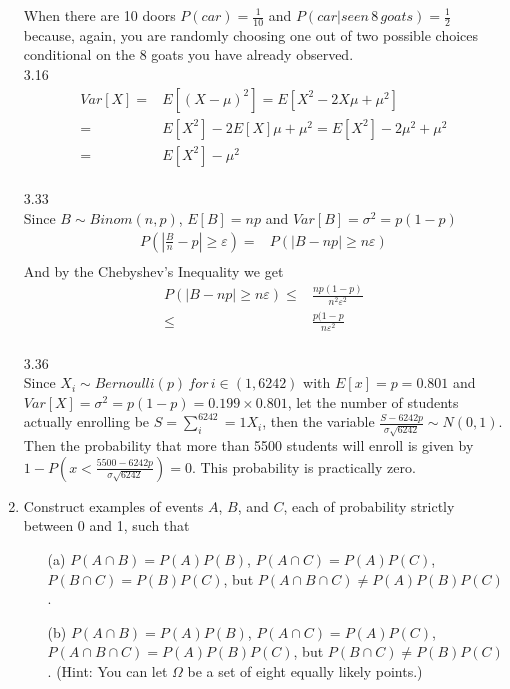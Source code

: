 \documentclass[letterpaper,12pt]{article}
\theoremstyle{definition}
\begin{document}
\begin{enumerate}
When there are 10 doors $P(car)=\frac{1}{10}$ and $P(car|seen\, 8\, goats) = \frac{1}{2}$ because, again, you are randomly choosing one out of two possible choices conditional on the 8 goats you have already observed.\\
3.16\\
\begin{align*}
Var[X] =& E\left[ (X-\mu)^2 \right] = E\left[ X^2 - 2 X \mu + \mu^2 \right] \\
=& E[X^2] - 2E[X]\mu +\mu^2 =  E[X^2] - 2\mu^2 +\mu^2 \\
=&  E[X^2] - \mu^2 
\end{align*}\\
3.33\\

Since $B \sim Binom(n, p)$, $E[B]=np$ and $Var[B]= \sigma^2 = p(1-p)$
\begin{align*}
P\left(|\frac{B}{n}-p| \geq \varepsilon \right) =& P \left( |B-np|  \geq n \varepsilon \right) \\
\end{align*}
And by the Chebyshev's Inequality we get
\begin{align*}
P \left( |B-np|  \geq n \varepsilon \right) \leq& \frac{np(1-p)}{n^2 \varepsilon^2} \\
\leq& \frac{p(1-p}{n \varepsilon^2}
\end{align*}\\

3.36\\
Since $X_i \sim Bernoulli(p)\, for \,  i \in (1, 6242)$ with $E[x]=p=0.801$ and $Var[X] = \sigma^2 =  p(1-p) = 0.199 \times 0.801$, let the number of students actually enrolling be $S = \sum^6242_i=1 X_i$, then the variable $\frac{S-6242p}{\sigma\sqrt{6242}} \sim N(0,1)$. Then the probability that more than 5500 students will enroll is given by $1-P(x < \frac{5500-6242p}{\sigma\sqrt{6242}}) = 0$. This probability is practically zero.
	\item Construct examples of events $A$, $B$, and $C$, each of probability strictly between 0 and 1, such that
   		\begin{itemize}
			\item[(a)] $P(A  \cap B) = P(A)P(B)$, $P(A  \cap C) = P(A)P(C)$, $P(B  \cap C) = P(B)P(C)$, but $P(A  \cap B \cap C) \neq P(A)P(B)P(C)$.
			\item[(b)] $P(A  \cap B) = P(A)P(B)$, $P(A  \cap C) = P(A)P(C)$, $P(A  \cap B \cap C) = P(A)P(B)P(C)$, but $P(B  \cap C) \neq P(B)P(C)$. (Hint: You can let $\Omega$ be a set of eight equally likely points.)
		\end{itemize}
		

\end{enumerate}
\end{document}
